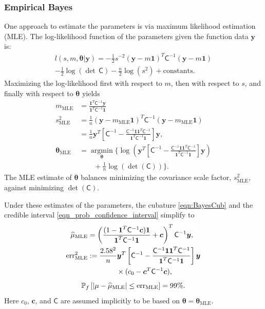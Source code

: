 \documentclass[twocolumn]{svjour3}          %
\newcommand{\bm}[1]{\boldsymbol{#1}}
\newcommand{\vtheta}{{\bm{\theta}}}
\newcommand{\vc}{\bm{c}}
\newcommand{\vy}{\bm{y}}
\newcommand{\vone}{\bm{1}}
\newcommand{\mC}{\mathsf{C}}
\newcommand{\mCInv}{{\mathsf{C}^{-1}}}
\newcommand{\hmu}{\widehat{\mu}}
\newcommand{\MLE}{\text{MLE}}
\newcommand{\err}{\textup{err}}
\providecommand{\argmin}{\operatorname*{argmin}}
\begin{document}
\subsubsection{Empirical Bayes}  \label{sec:MLE}
One approach to estimate the parameters is via maximum likelihood estimation (MLE).  The log-likelihood function of the parameters given the function data $\vy$ is:
\begin{multline}
l(s,m,\vtheta | \vy)
= -\frac{1}{2} s^{-2} (\vy-m\vone)^T\mCInv(\vy-m\vone) 
\\
 - \frac{1}{2} \log(\det\, \mC) - \frac{n}{2} \log(s^2) + \text{constants.}
\end{multline}
Maximizing the log-likelihood first with respect to $m$, then with respect to $s$, and finally with respect to $\vtheta$ yields
\begin{align}
\label{eqn_m_MLE}
m_\MLE &= \frac{\vone^T \mCInv \vy }{ \vone^T \mCInv \vone} \\
\nonumber
s^2_{\MLE}  
&= \frac{1}{n} (\vy-m_{\MLE}\vone)^T\mCInv(\vy-m_{\MLE}\vone) 
\\
\label{eqn_s2_MLE}
&= 
\frac{1}{n}
\vy^T 
\left[ 
\mCInv - 
\frac{ \mCInv \vone \vone^T \mCInv }{\vone^T\mCInv \vone}
\right] \vy, \\
\nonumber
\vtheta_\MLE
&= \argmin_{\vtheta} \biggl \{
\log\left(\vy^T 
\left[ \mCInv - 
\frac{ \mCInv \vone \vone^T \mCInv }{\vone^T\mCInv \vone}
\right] \vy 
\right)  \\
\label{eqn:thetaMLE}
 & \qquad +  \frac{1}{n} \log(\det(\mC))
\biggr \}.
\end{align}
The MLE estimate of $\vtheta$ balances minimizing the covariance scale factor, $s^2_{\MLE}$, against minimizing  $\det(\mC)$. 

Under these estimates of the parameters, the cubature \eqref{eqn:BayesCub} and the credible interval \eqref{eqn_prob_confidence_interval} simplify to 
\begin{align} \label{eqn:cubMLE}
\hmu_\MLE  &= 
\left(
\frac{ (1 - \vone^T  \mCInv\vc )  \vone }{ \vone^T \mCInv \vone}   +  \vc 
\right)^T  \mCInv \vy, \\
 \label{eqn:errMLE}
\err_\MLE^2 & : = \frac{2.58^2}{n}
 \vy^T \left[ \mCInv - 
\frac{ \mCInv \vone \vone^T \mCInv }{\vone^T\mCInv \vone}
\right] \vy \\
&\qquad \qquad \times 
(c_0 - \vc^T\mC^{-1}\vc ),
\end{align}
\begin{equation}
\label{eqn_prob_CI_MLE}
\mathbb{P}_f \left[
|\mu-\hmu_\MLE| \leq \err_\MLE \right]  = 99\%.
\end{equation}
Here $c_0$, $\vc$, and $\mC$ are assumed implicitly to be based on $\vtheta = \vtheta_\MLE$.   
\end{document}

